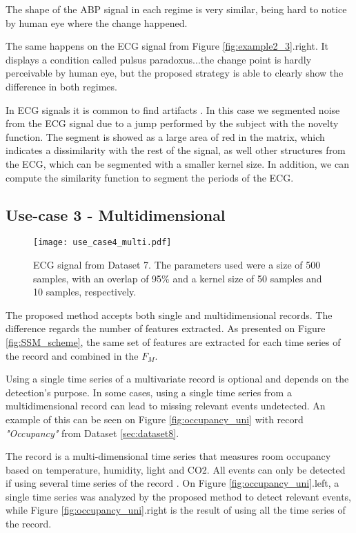 The shape of the \gls{ABP} signal in each regime is very similar, being  hard to notice by human eye where the change happened.
\par
The same happens on the \gls{ECG} signal from Figure \ref{fig:example2_3}.right. It displays a condition called pulsus paradoxus...the change point is hardly perceivable by human eye, but the proposed strategy is able to clearly show the difference in both regimes.

In ECG signals it is common to find artifacts \cite{dataset6}. In this case we segmented noise from the ECG signal due to a jump performed by the subject with the novelty function. The segment is showed as a large area of red in the matrix, which indicates a dissimilarity with the rest of the signal, as well other structures from the ECG, which can be segmented with a smaller kernel size. In addition, we can compute the similarity function to segment the periods of the ECG.


\subsection{Use-case 3 - Multidimensional}


\begin{figure}
    \centering
    \texttt{[image: use\_case4\_multi.pdf]}
    \caption{ECG signal from Dataset 7. The parameters used were a size of 500 samples, with an overlap of 95\% and a kernel size of 50 samples and 10 samples, respectively.}
    \label{fig:example4}
\end{figure}

The proposed method accepts both single and multidimensional records. The difference regards the number of features extracted. As presented on Figure \ref{fig:SSM_scheme}, the same set of features are extracted for each time series of the record and combined in the $F_M$. 
\par
Using a single time series of a multivariate record is optional and depends on the detection's purpose. In some cases, using a single time series from a multidimensional record can lead to missing relevant events undetected. An example of this can be seen on Figure \ref{fig:occupancy_uni} with record \textit{"Occupancy"} from Dataset \ref{sec:dataset8}. 
\par
The record is a multi-dimensional time series that measures room occupancy based on temperature, humidity, light and CO2. All events can only be detected if using several time series of the record \cite{cpd_alan}. On Figure \ref{fig:occupancy_uni}.left, a single time series was analyzed by the proposed method to detect relevant events, while Figure \ref{fig:occupancy_uni}.right is the result of using all the time series of the record.


